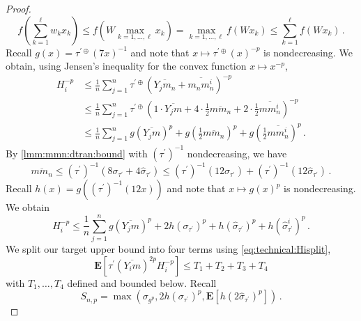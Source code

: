 \documentclass{article}
\newcommand{\lab}{\left[} %
\newcommand{\rab}{\right]} %
\newcommand{\ab}[1]{\lab #1 \rab} %
\newcommand{\abOf}[1]{\!\ab{#1}} %
\newcommand{\lb}{\left(} %
\newcommand{\rb}{\right)} %
\newcommand{\br}[1]{\lb #1 \rb} %
\newcommand{\brOf}[1]{\!\br{#1}} %
\newcommand{\E}{\mathbf{E}} %
\newcommand{\EOf}[1]{\E\abOf{#1}}
\newcommand{\pr}{^\prime}
\newcommand{\eqfs}{\,.}
\newcommand{\ol}[2]{\overline{#1#2}}
\newcommand{\dtran}{\tau\pr}
\newcommand{\ddrtran}{\tau^{\prime\oplus}}
\newcommand{\invdtran}{(\tau\pr)^{-1}}
\begin{document}
\begin{proof}
    \begin{equation}
        f\brOf{\sum_{k=1}^\ell w_k x_k} 
        \leq 
        f\brOf{W \max_{k=1,\dots,\ell} x_k}
        = 
        \max_{k=1,\dots,\ell} f\brOf{W x_k}
        \leq 
        \sum_{k=1}^\ell	f\brOf{W x_k}
        \eqfs
    \end{equation}
    Recall $g(x) = \ddrtran(7 x)^{-1}$ and note that $x\mapsto \ddrtran(x)^{-p}$ is nondecreasing. We obtain, using Jensen's inequality for the convex function $x\mapsto x^{-p}$,
    \begin{align}
        H_i^{-p}
        &\leq
        \frac1n \sum_{j=1}^n \ddrtran(\ol{Y_j}{m_n}+\ol{m_n}{m_n^i})^{-p}
        \\&\leq
        \frac1n \sum_{j=1}^n \ddrtran\brOf{1\cdot\ol{Y_j}{m}+ 4\cdot \frac12 \ol m{m_n} + 2\cdot \frac12 \ol m{m_n^i}}^{-p}
        \\&\leq
        \frac1n \sum_{j=1}^n g(\ol{Y_j}{m})^p + g\brOf{\frac12\ol{m}{m_n}}^p + g\brOf{\frac12\ol{m}{m_n^i}}^p
        \eqfs
    \end{align}
    By \cref{lmm:mmn:dtran:bound} with $\invdtran$ nondecreasing, we have
    \begin{equation}
        \ol m{m_n}
        \leq
        \invdtran\brOf{8 \sigma_{\dtran} + 4 \hat \sigma_{\dtran}} 
        \leq
        \invdtran\brOf{12 \sigma_{\dtran}} + \invdtran\brOf{12 \hat \sigma_{\dtran}} 
        \eqfs
    \end{equation}
    Recall $h(x) = g(\invdtran(12 x))$ and note that $x\mapsto g(x)^p$ is nondecreasing. We obtain
    \begin{equation}\label{eq:technical:Hisplit}
        H_i^{-p}
        \leq
        \frac1n \sum_{j=1}^n g(\ol{Y_j}{m})^p +
        2 h(\sigma_{\dtran})^p +
        h(\hat\sigma_{\dtran})^p
        +
        h(\hat\sigma^i_{\dtran})^p
        \eqfs
    \end{equation}
    We split our target upper bound into four terms using \eqref{eq:technical:Hisplit},
    \begin{equation}\label{eq:technical:Hisplit:T}
        \EOf{\dtran(\ol{Y_i}m)^{2p} H_i^{-p}} \leq T_1 + T_2 + T_3 + T_4
    \end{equation}
    with $T_1, \dots, T_4$ defined and bounded below.
    Recall
    \begin{equation}
            S_{n,p} = \max\brOf{
                \sigma_{g^p}, 
                2 h(\sigma_{\dtran})^p,
                \EOf{ h(2\hat\sigma_{\dtran})^p}
            }
            \eqfs
    \end{equation}

\end{proof}
\end{document}
